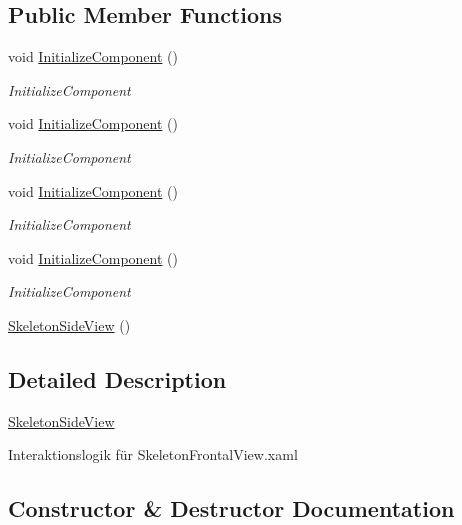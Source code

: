 \subsection*{Public Member Functions}
\begin{DoxyCompactItemize}
\item 
void \hyperlink{class_rowing_monitor_1_1_view_1_1_skeleton_side_view_ae823832e7aa40c2585f66c0939c83040}{Initialize\+Component} ()
\begin{DoxyCompactList}\small\item\em Initialize\+Component \end{DoxyCompactList}\item 
void \hyperlink{class_rowing_monitor_1_1_view_1_1_skeleton_side_view_ae823832e7aa40c2585f66c0939c83040}{Initialize\+Component} ()
\begin{DoxyCompactList}\small\item\em Initialize\+Component \end{DoxyCompactList}\item 
void \hyperlink{class_rowing_monitor_1_1_view_1_1_skeleton_side_view_ae823832e7aa40c2585f66c0939c83040}{Initialize\+Component} ()
\begin{DoxyCompactList}\small\item\em Initialize\+Component \end{DoxyCompactList}\item 
void \hyperlink{class_rowing_monitor_1_1_view_1_1_skeleton_side_view_ae823832e7aa40c2585f66c0939c83040}{Initialize\+Component} ()
\begin{DoxyCompactList}\small\item\em Initialize\+Component \end{DoxyCompactList}\item 
\hyperlink{class_rowing_monitor_1_1_view_1_1_skeleton_side_view_ac992a058049b0260d490432660e52650}{Skeleton\+Side\+View} ()
\end{DoxyCompactItemize}


\subsection{Detailed Description}
\hyperlink{class_rowing_monitor_1_1_view_1_1_skeleton_side_view}{Skeleton\+Side\+View} 

Interaktionslogik für Skeleton\+Frontal\+View.\+xaml 

\subsection{Constructor \& Destructor Documentation}
\mbox{\label{class_rowing_monitor_1_1_view_1_1_skeleton_side_view_ac992a058049b0260d490432660e52650}} 
